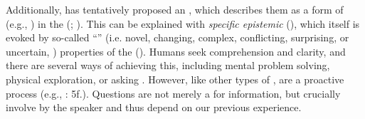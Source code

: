 Additionally,  has tentatively proposed an , which describes them as a form of \textit{} (e.g., \citealt{Gibson1988}) in the \textit{} (\citealt{Gibson1979}; \citealt{Hodges2009}). This  can be explained with \textit{specific epistemic } (\citealt{Berlyne1954,Loewenstein1994}), which itself is evoked by so-called “” (i.e. novel, changing, complex, conflicting, surprising, or uncertain, \citealt{Berlyne1978}) properties of the  (\citealt{Järvilehto1998,Turvey2009}). Humans seek comprehension and clarity, and there are several ways of achieving this, including mental problem solving, physical exploration, or asking . However, like other types of ,  are a proactive process (e.g., \citealt{Gibson1988}: 5f.). Questions are not merely a  for information, but crucially involve  by the speaker and thus depend on our previous experience.